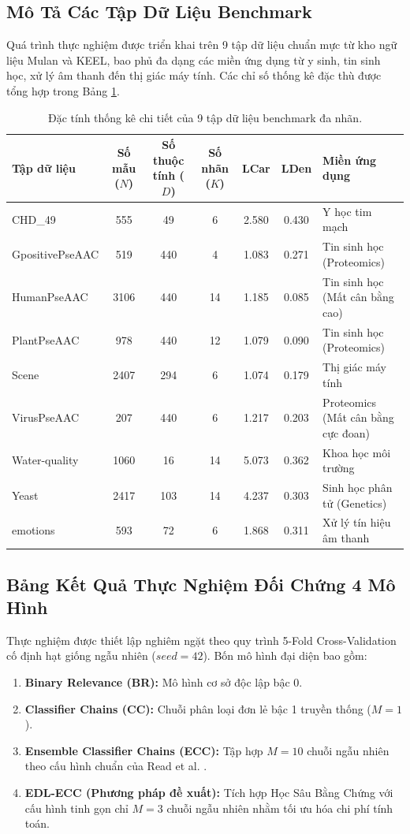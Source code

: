 \documentclass[1p,times]{elsarticle}
\begin{document}
\subsection{Mô Tả Các Tập Dữ Liệu Benchmark}
Quá trình thực nghiệm được triển khai trên 9 tập dữ liệu chuẩn mực từ kho ngữ liệu Mulan và KEEL, bao phủ đa dạng các miền ứng dụng từ y sinh, tin sinh học, xử lý âm thanh đến thị giác máy tính. Các chỉ số thống kê đặc thù được tổng hợp trong Bảng \ref{tab:dataset_stats}.

\begin{table}[htbp]
\centering
\caption{Đặc tính thống kê chi tiết của 9 tập dữ liệu benchmark đa nhãn.}
\label{tab:dataset_stats}
\small
\begin{tabular*}{\textwidth}{@{\extracolsep{\fill}}lcccccp{3.2cm}}
\toprule
\textbf{Tập dữ liệu} & \textbf{Số mẫu ($N$)} & \textbf{Số thuộc tính ($D$)} & \textbf{Số nhãn ($K$)} & \textbf{LCar} & \textbf{LDen} & \textbf{Miền ứng dụng} \\
\midrule
CHD\_49 & 555 & 49 & 6 & 2.580 & 0.430 & Y học tim mạch \\
GpositivePseAAC & 519 & 440 & 4 & 1.083 & 0.271 & Tin sinh học (Proteomics) \\
HumanPseAAC & 3106 & 440 & 14 & 1.185 & 0.085 & Tin sinh học (Mất cân bằng cao) \\
PlantPseAAC & 978 & 440 & 12 & 1.079 & 0.090 & Tin sinh học (Proteomics) \\
Scene & 2407 & 294 & 6 & 1.074 & 0.179 & Thị giác máy tính \\
VirusPseAAC & 207 & 440 & 6 & 1.217 & 0.203 & Proteomics (Mất cân bằng cực đoan) \\
Water-quality & 1060 & 16 & 14 & 5.073 & 0.362 & Khoa học môi trường \\
Yeast & 2417 & 103 & 14 & 4.237 & 0.303 & Sinh học phân tử (Genetics) \\
emotions & 593 & 72 & 6 & 1.868 & 0.311 & Xử lý tín hiệu âm thanh \\
\bottomrule
\end{tabular*}
\end{table}

\subsection{Bảng Kết Quả Thực Nghiệm Đối Chứng 4 Mô Hình}
Thực nghiệm được thiết lập nghiêm ngặt theo quy trình 5-Fold Cross-Validation cố định hạt giống ngẫu nhiên ($seed = 42$). Bốn mô hình đại diện bao gồm:
\begin{enumerate}
    \item \textbf{Binary Relevance (BR):} Mô hình cơ sở độc lập bậc 0.
    \item \textbf{Classifier Chains (CC):} Chuỗi phân loại đơn lẻ bậc 1 truyền thống \citep{read2011classifier} ($M=1$).
    \item \textbf{Ensemble Classifier Chains (ECC):} Tập hợp $M=10$ chuỗi ngẫu nhiên theo cấu hình chuẩn của Read et al. \citep{read2011classifier}.
    \item \textbf{EDL-ECC (Phương pháp đề xuất):} Tích hợp Học Sâu Bằng Chứng với cấu hình tinh gọn chỉ $M=3$ chuỗi ngẫu nhiên nhằm tối ưu hóa chi phí tính toán.
\end{enumerate}
\end{document}
